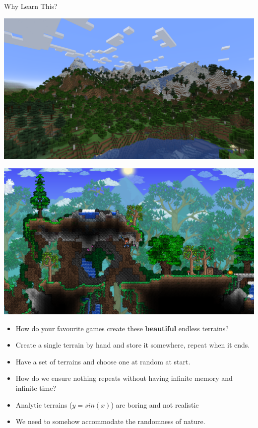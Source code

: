\begin{frame}{Why Learn This?}
    \pause
    \begin{minipage}{0.45\textwidth}
        \centering
        \includegraphics[width=\linewidth]{images/minecraft.png}
    \end{minipage}%
    \hfill
    \pause
    \begin{minipage}{0.45\textwidth}
        \centering
        \includegraphics[width=\linewidth]{images/terraria.png}
    \end{minipage}

    \begin{itemize}
        \item<3-> How do your favourite games create these \textbf{beautiful} endless terrains?
        \item<4-> Create a single terrain by hand and store it somewhere, repeat when it ends.
        \item<5-> Have a set of terrains and choose one at random at start.
        \item<6-> How do we ensure nothing repeats without having infinite memory and infinite time?
        \item<7-> Analytic terrains ($y = sin(x)$) are boring and not realistic
        \item<8-> We need to somehow accommodate the randomness of nature.
    \end{itemize}
\end{frame}

